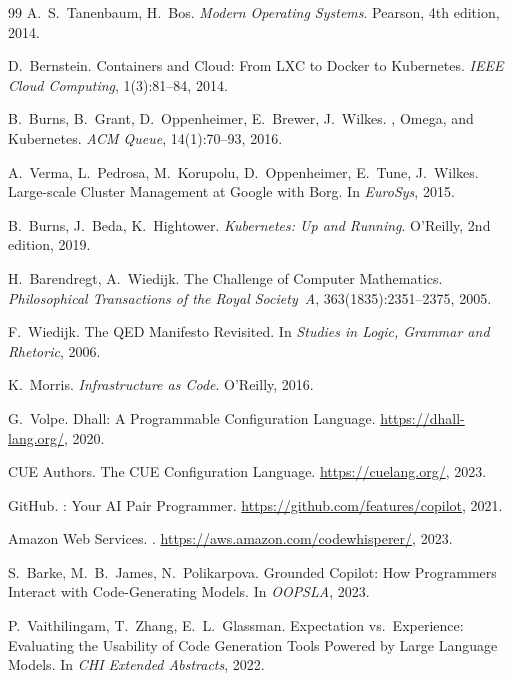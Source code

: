 \documentclass[11pt]{article}
\begin{document}
\begin{thebibliography}{99}
A.~S.~Tanenbaum, H.~Bos.
\newblock \emph{Modern Operating Systems}.
\newblock Pearson, 4th edition, 2014.

D.~Bernstein.
\newblock Containers and Cloud: From {LXC} to {Docker} to {Kubernetes}.
\newblock \emph{IEEE Cloud Computing}, 1(3):81--84, 2014.

B.~Burns, B.~Grant, D.~Oppenheimer, E.~Brewer, J.~Wilkes.
, {Omega}, and {Kubernetes}.
\newblock \emph{ACM Queue}, 14(1):70--93, 2016.

A.~Verma, L.~Pedrosa, M.~Korupolu, D.~Oppenheimer, E.~Tune,
  J.~Wilkes.
\newblock Large-scale Cluster Management at {Google} with {Borg}.
\newblock In \emph{EuroSys}, 2015.

B.~Burns, J.~Beda, K.~Hightower.
\newblock \emph{Kubernetes: Up and Running}.
\newblock O'Reilly, 2nd edition, 2019.

H.~Barendregt, A.~Wiedijk.
\newblock The Challenge of Computer Mathematics.
\newblock \emph{Philosophical Transactions of the Royal Society~A},
  363(1835):2351--2375, 2005.

F.~Wiedijk.
\newblock The {QED} Manifesto Revisited.
\newblock In \emph{Studies in Logic, Grammar and Rhetoric}, 2006.

K.~Morris.
\newblock \emph{Infrastructure as Code}.
\newblock O'Reilly, 2016.

G.~Volpe.
\newblock Dhall: A Programmable Configuration Language.
\newblock \url{https://dhall-lang.org/}, 2020.

{CUE Authors}.
\newblock The {CUE} Configuration Language.
\newblock \url{https://cuelang.org/}, 2023.

{GitHub}.
: Your {AI} Pair Programmer.
\newblock \url{https://github.com/features/copilot}, 2021.

{Amazon Web Services}.
.
\newblock \url{https://aws.amazon.com/codewhisperer/}, 2023.

S.~Barke, M.~B.~James, N.~Polikarpova.
\newblock Grounded Copilot: How Programmers Interact with
  Code-Generating Models.
\newblock In \emph{OOPSLA}, 2023.

P.~Vaithilingam, T.~Zhang, E.~L.~Glassman.
\newblock Expectation vs.\ Experience: Evaluating the Usability of
  Code Generation Tools Powered by Large Language Models.
\newblock In \emph{CHI Extended Abstracts}, 2022.


\end{thebibliography}
\end{document}
